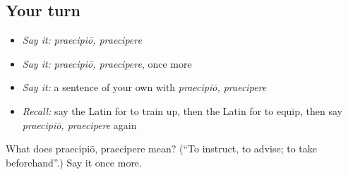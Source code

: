 \subsection*{Your turn}
\begin{itemize}
\raggedright
  \item \emph{Say it:} \emph{praecipiō, praecipere}
  \item \emph{Say it:} \emph{praecipiō, praecipere}, once more
  \item \emph{Say it:} a sentence of your own with \emph{praecipiō, praecipere}
  \item \emph{Recall:} say the Latin for to train up, then the Latin for to equip, then say \emph{praecipiō, praecipere} again
\end{itemize}

\begin{tcolorbox}[breakable,colback=teal!4,colframe=teal!35!black,title={Before you move on}]
What does praecipiō, praecipere mean? (\textquotedblleft{}To instruct, to advise; to take beforehand\textquotedblright{}.) Say it once more.
\end{tcolorbox}
